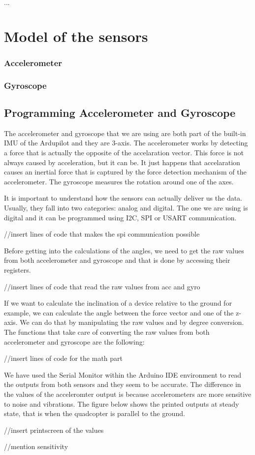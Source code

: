 ...

\section{Model of the sensors}

\subsubsection{Accelerometer}

\subsubsection{Gyroscope}

\subsection{Programming Accelerometer and Gyroscope}
The accelerometer and gyroscope that we are using are both part of the built-in IMU of the Ardupilot and they are 3-axis. The accelerometer works by detecting a force that is actually the opposite of the accelaration vector. This force is not always caused by acceleration, but it can be. It just happens that accelaration causes an inertial force that is captured by the force detection mechanism of the accelerometer. The gyroscope measures the rotation around one of the axes.

It is important to understand how the sensors can actually deliver us the data. Usually, they fall into two categories: analog and digital. The one we are using is digital and it can be programmed using I2C, SPI or USART communication. 

//insert lines of code that makes the spi communication possible

Before getting into the calculations of the angles, we need to get the raw values from both accelerometer and gyroscope and that is done by accessing their registers.

//insert lines of code that read the raw values from acc and gyro

If we want to calculate the inclination of a device relative to the ground for example, we can calculate the angle between the force vector and one of the z-axis. We can do that by manipulating the raw values and by degree conversion. The functions that take care of converting the raw values from both accelerometer and gyroscope are the following:

//insert lines of code for the math part

We have used the Serial Monitor within the Arduino IDE environment to read the outputs from both sensors and they seem to be accurate. The difference in the values of the acceleromter output is because accelerometers are more sensitive to noise and vibrations. The figure below shows the printed outputs at steady state, that is when the quadcopter is parallel to the ground.

//insert printscreen of the values


//mention sensitivity 